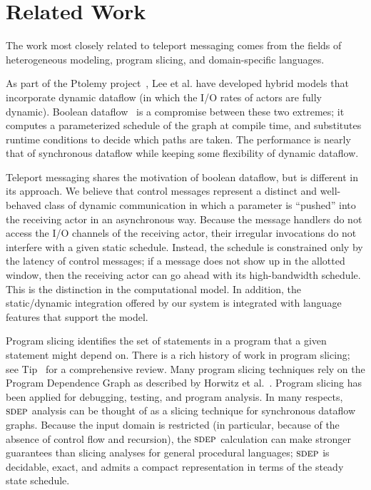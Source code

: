 %
%

\section{Related Work}

The work most closely related to teleport messaging comes from the
fields of heterogeneous modeling, program slicing, and domain-specific
languages.

As part of the Ptolemy project~\cite{eker_taming_2003}, Lee et
al. have developed hybrid models that incorporate dynamic dataflow (in
which the I/O rates of actors are fully dynamic).  Boolean
dataflow~\cite{ha97profile} is a compromise between these two
extremes; it computes a parameterized schedule of the graph at compile
time, and substitutes runtime conditions to decide which paths are
taken.  The performance is nearly that of synchronous dataflow while
keeping some flexibility of dynamic dataflow.

Teleport messaging shares the motivation of boolean dataflow, but is
different in its approach.  We believe that control messages represent
a distinct and well-behaved class of dynamic communication in which a
parameter is ``pushed'' into the receiving actor in an asynchronous
way.  Because the message handlers do not access the I/O channels of
the receiving actor, their irregular invocations do not interfere with
a given static schedule.  Instead, the schedule is constrained only by
the latency of control messages; if a message does not show up in the
allotted window, then the receiving actor can go ahead with its
high-bandwidth schedule.  This is the distinction in the computational
model.  In addition, the static/dynamic integration offered by our
system is integrated with language features that support the model.

Program slicing identifies the set of statements in a program that a
given statement might depend on.  There is a rich history of work in
program slicing; see Tip~\cite{tip95slice} for a comprehensive review.
Many program slicing techniques rely on the Program Dependence Graph
as described by Horwitz et al.~\cite{hrb88pdg}.  Program slicing has
been applied for debugging, testing, and program analysis.  In many
respects, $\textsc{sdep}$ analysis can be thought of as a slicing technique
for synchronous dataflow graphs.  Because the input domain is
restricted (in particular, because of the absence of control flow and
recursion), the $\textsc{sdep}$ calculation can make stronger guarantees than
slicing analyses for general procedural languages; $\textsc{sdep}$ is
decidable, exact, and admits a compact representation in terms of the
steady state schedule.

